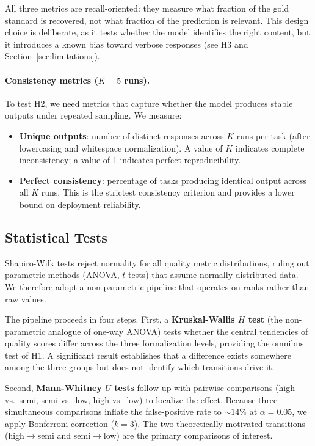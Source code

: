 \documentclass[runningheads]{llncs}
\begin{document}
All three metrics are recall-oriented: they measure what fraction of the gold standard is recovered, not what fraction of the prediction is relevant. This design choice is deliberate, as it tests whether the model identifies the right content, but it introduces a known bias toward verbose responses (see H3 and Section~\ref{sec:limitations}).

\paragraph{Consistency metrics ($K\!=\!5$ runs).}
To test H2, we need metrics that capture whether the model produces stable outputs under repeated sampling. We measure:

\begin{itemize}[noitemsep]
  \item \textbf{Unique outputs}: number of distinct responses across $K$ runs per task (after lowercasing and whitespace normalization). A value of $K$ indicates complete inconsistency; a value of 1 indicates perfect reproducibility.
  \item \textbf{Perfect consistency}: percentage of tasks producing identical output across all $K$ runs. This is the strictest consistency criterion and provides a lower bound on deployment reliability.
\end{itemize}

\subsection{Statistical Tests}
\label{sec:stats}

Shapiro-Wilk tests reject normality for all quality metric distributions, ruling out parametric methods (ANOVA, $t$-tests) that assume normally distributed data. We therefore adopt a non-parametric pipeline that operates on ranks rather than raw values.

The pipeline proceeds in four steps. First, a \textbf{Kruskal-Wallis $H$ test} (the non-parametric analogue of one-way ANOVA) tests whether the central tendencies of quality scores differ across the three formalization levels, providing the omnibus test of H1. A significant result establishes that a difference exists somewhere among the three groups but does not identify which transitions drive it.

Second, \textbf{Mann-Whitney $U$ tests} follow up with pairwise comparisons (high vs.\ semi, semi vs.\ low, high vs.\ low) to localize the effect. Because three simultaneous comparisons inflate the false-positive rate to ${\sim}14\%$ at $\alpha\!=\!0.05$, we apply Bonferroni correction ($k\!=\!3$). The two theoretically motivated transitions (high$\to$semi and semi$\to$low) are the primary comparisons of interest.
\end{document}
